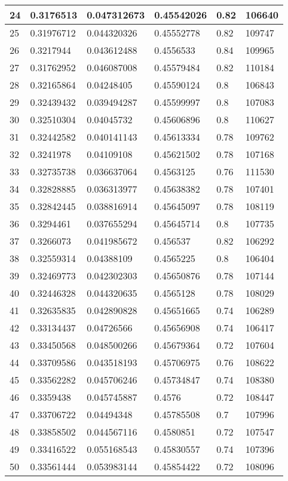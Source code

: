 \begin{longtable}{|l|l|l|l|l|l|}
24 & 0.3176513 & 0.047312673 & 0.45542026 & 0.82 & 106640 \\ \hline 
25 & 0.31976712 & 0.044320326 & 0.45552778 & 0.82 & 109747 \\ \hline 
26 & 0.3217944 & 0.043612488 & 0.4556533 & 0.84 & 109965 \\ \hline 
27 & 0.31762952 & 0.046087008 & 0.45579484 & 0.82 & 110184 \\ \hline 
28 & 0.32165864 & 0.04248405 & 0.45590124 & 0.8 & 106843 \\ \hline 
29 & 0.32439432 & 0.039494287 & 0.45599997 & 0.8 & 107083 \\ \hline 
30 & 0.32510304 & 0.04045732 & 0.45606896 & 0.8 & 110627 \\ \hline 
31 & 0.32442582 & 0.040141143 & 0.45613334 & 0.78 & 109762 \\ \hline 
32 & 0.3241978 & 0.04109108 & 0.45621502 & 0.78 & 107168 \\ \hline 
33 & 0.32735738 & 0.036637064 & 0.4563125 & 0.76 & 111530 \\ \hline 
34 & 0.32828885 & 0.036313977 & 0.45638382 & 0.78 & 107401 \\ \hline 
35 & 0.32842445 & 0.038816914 & 0.45645097 & 0.78 & 108119 \\ \hline 
36 & 0.3294461 & 0.037655294 & 0.45645714 & 0.8 & 107735 \\ \hline 
37 & 0.3266073 & 0.041985672 & 0.456537 & 0.82 & 106292 \\ \hline 
38 & 0.32559314 & 0.04388109 & 0.4565225 & 0.8 & 106404 \\ \hline 
39 & 0.32469773 & 0.042302303 & 0.45650876 & 0.78 & 107144 \\ \hline 
40 & 0.32446328 & 0.044320635 & 0.4565128 & 0.78 & 108029 \\ \hline 
41 & 0.32635835 & 0.042890828 & 0.45651665 & 0.74 & 106289 \\ \hline 
42 & 0.33134437 & 0.04726566 & 0.45656908 & 0.74 & 106417 \\ \hline 
43 & 0.33450568 & 0.048500266 & 0.45679364 & 0.72 & 107604 \\ \hline 
44 & 0.33709586 & 0.043518193 & 0.45706975 & 0.76 & 108622 \\ \hline 
45 & 0.33562282 & 0.045706246 & 0.45734847 & 0.74 & 108380 \\ \hline 
46 & 0.3359438 & 0.045745887 & 0.4576 & 0.72 & 108447 \\ \hline 
47 & 0.33706722 & 0.04494348 & 0.45785508 & 0.7 & 107996 \\ \hline 
48 & 0.33858502 & 0.044567116 & 0.4580851 & 0.72 & 107547 \\ \hline 
49 & 0.33416522 & 0.055168543 & 0.45830557 & 0.74 & 107396 \\ \hline 
50 & 0.33561444 & 0.053983144 & 0.45854422 & 0.72 & 108096 \\ \hline 
\end{longtable}